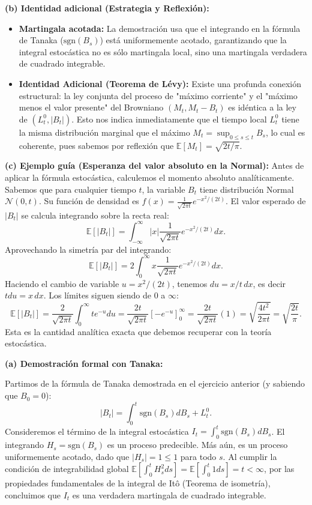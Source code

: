 \documentclass[11pt, letterpaper]{article}
\begin{document}
\begin{solucion}
    \textbf{(b) Identidad adicional (Estrategia y Reflexión):}
    \begin{itemize}
        \item[(i)] \textbf{Martingala acotada:} La demostración usa que el integrando en la fórmula de Tanaka ($\text{sgn}(B_s)$) está uniformemente acotado, garantizando que la integral estocástica no es sólo martingala local, sino una martingala verdadera de cuadrado integrable.
        \item[(ii)] \textbf{Identidad Adicional (Teorema de Lévy):} Existe una profunda conexión estructural: la ley conjunta del proceso de "máximo corriente" y el "máximo menos el valor presente" del Browniano $(M_t, M_t - B_t)$ es idéntica a la ley de $(L_t^0, |B_t|)$. Esto nos indica inmediatamente que el tiempo local $L_t^0$ tiene la misma distribución marginal que el máximo $M_t = \sup_{0\le s\le t} B_s$, lo cual es coherente, pues sabemos por reflexión que $\mathbb{E}[M_t] = \sqrt{2t/\pi}$.
    \end{itemize}

    \vspace{3mm}
    \textbf{(c) Ejemplo guía (Esperanza del valor absoluto en la Normal):}
    Antes de aplicar la fórmula estocástica, calculemos el momento absoluto analíticamente. 
    Sabemos que para cualquier tiempo $t$, la variable $B_t$ tiene distribución Normal $\mathcal{N}(0, t)$. Su función de densidad es $f(x) = \frac{1}{\sqrt{2\pi t}} e^{-x^2 / (2t)}$.
    El valor esperado de $|B_t|$ se calcula integrando sobre la recta real:
    \[ \mathbb{E}[|B_t|] = \int_{-\infty}^{\infty} |x| \frac{1}{\sqrt{2\pi t}} e^{-x^2 / (2t)} dx. \]
    Aprovechando la simetría par del integrando:
    \[ \mathbb{E}[|B_t|] = 2 \int_{0}^{\infty} x \frac{1}{\sqrt{2\pi t}} e^{-x^2 / (2t)} dx. \]
    Haciendo el cambio de variable $u = x^2/(2t)$, tenemos $du = x/t \, dx$, es decir $tdu = x \, dx$. Los límites siguen siendo de $0$ a $\infty$:
    \[ \mathbb{E}[|B_t|] = \frac{2}{\sqrt{2\pi t}} \int_{0}^{\infty} t e^{-u} du = \frac{2t}{\sqrt{2\pi t}} \left[-e^{-u}\right]_0^\infty = \frac{2t}{\sqrt{2\pi t}} (1) = \sqrt{\frac{4t^2}{2\pi t}} = \sqrt{\frac{2t}{\pi}}. \]
    Esta es la cantidad analítica exacta que debemos recuperar con la teoría estocástica.

    \vspace{3mm}
    \textbf{(a) Demostración formal con Tanaka:}
    
    Partimos de la fórmula de Tanaka demostrada en el ejercicio anterior (y sabiendo que $B_0 = 0$):
    \[ |B_t| = \int_0^t \text{sgn}(B_s) dB_s + L_t^0. \]
    Consideremos el término de la integral estocástica $I_t = \int_0^t \text{sgn}(B_s) dB_s$. El integrando $H_s = \text{sgn}(B_s)$ es un proceso predecible. 
    Más aún, es un proceso uniformemente acotado, dado que $|H_s| = 1 \le 1$ para todo $s$. 
    Al cumplir la condición de integrabilidad global $\mathbb{E}[\int_0^t H_s^2 ds] = \mathbb{E}[\int_0^t 1 ds] = t < \infty$, por las propiedades fundamentales de la integral de Itô (Teorema de isometría), concluimos que $I_t$ es una verdadera martingala de cuadrado integrable.
    

\end{solucion}
\end{document}
